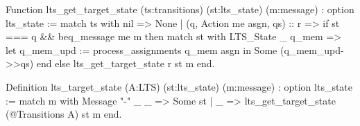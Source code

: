Function lts_get_target_state (ts:transitions) (st:lts_state) 
                                (m:message) : option lts_state :=
  match ts with
    nil                          => None
  | (q, Action me asgn, qs) :: r => 
      if st === q && beq_message me m then 
        match st with
          LTS_State _ q_mem =>
            let q_mem_upd := process_assignments q_mem asgn in  
            Some (q_mem_upd->>qs) 
        end
      else 
        lts_get_target_state r st m 
  end.

Definition lts_target_state (A:LTS) (st:lts_state) (m:message) 
                                            : option lts_state :=
  match m with
    Message "-" _ _ => Some st
  | _ => lts_get_target_state (@Transitions A) st m
  end.